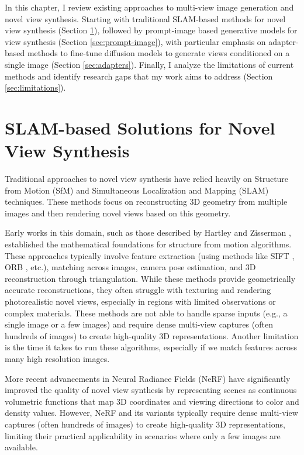 \label{chapter:related}

In this chapter, I review existing approaches to multi-view image generation and novel view synthesis. Starting with traditional SLAM-based methods for novel view synthesis (Section \ref{sec:slam}), followed by prompt-image based generative models for view synthesis (Section \ref{sec:prompt-image}), with particular emphasis on adapter-based methods to fine-tune diffusion models to generate views conditioned on a single image (Section \ref{sec:adapters}). Finally, I analyze the limitations of current methods and identify research gaps that my work aims to address (Section \ref{sec:limitations}).

\section{SLAM-based Solutions for Novel View Synthesis}\label{sec:slam}

Traditional approaches to novel view synthesis have relied heavily on Structure from Motion (SfM) and Simultaneous Localization and Mapping (SLAM) techniques. These methods focus on reconstructing 3D geometry from multiple images and then rendering novel views based on this geometry.

Early works in this domain, such as those described by Hartley and Zisserman \cite{multipleviewgeometry}, established the mathematical foundations for structure from motion algorithms. These approaches typically involve feature extraction (using methods like SIFT \cite{sift}, ORB \cite{orb}, etc.), matching across images, camera pose estimation, and 3D reconstruction through triangulation. While these methods provide geometrically accurate reconstructions, they often struggle with texturing and rendering photorealistic novel views, especially in regions with limited observations or complex materials. 
These methods are not able to handle sparse inputs (e.g., a single image or a few images) and require dense multi-view captures (often hundreds of images) to create high-quality 3D representations. Another limitation is the time it takes to run these algorithms, especially if we match features across many high resolution images.

More recent advancements in Neural Radiance Fields (NeRF) \cite{nerf} have significantly improved the quality of novel view synthesis by representing scenes as continuous volumetric functions that map 3D coordinates and viewing directions to color and density values. However, NeRF and its variants typically require dense multi-view captures (often hundreds of images) to create high-quality 3D representations, limiting their practical applicability in scenarios where only a few images are available.


